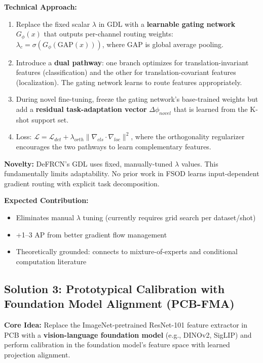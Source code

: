 \documentclass[11pt,a4paper]{article}
\begin{document}
\textbf{Technical Approach:}
\begin{enumerate}[nosep]
    \item Replace the fixed scalar $\lambda$ in GDL with a \textbf{learnable gating network} $G_\phi(x)$ that outputs per-channel routing weights: $\lambda_c = \sigma(G_\phi(\text{GAP}(x)))$, where GAP is global average pooling.
    \item Introduce a \textbf{dual pathway}: one branch optimizes for translation-invariant features (classification) and the other for translation-covariant features (localization). The gating network learns to route features appropriately.
    \item During novel fine-tuning, freeze the gating network's base-trained weights but add a \textbf{residual task-adaptation vector} $\Delta\phi_{novel}$ that is learned from the K-shot support set.
    \item Loss: $\mathcal{L} = \mathcal{L}_{det} + \lambda_{orth}\|\nabla_{cls} \cdot \nabla_{loc}\|^2$, where the orthogonality regularizer encourages the two pathways to learn complementary features.
\end{enumerate}

\textbf{Novelty:} DeFRCN's GDL uses fixed, manually-tuned $\lambda$ values. This fundamentally limits adaptability. No prior work in FSOD learns input-dependent gradient routing with explicit task decomposition.

\textbf{Expected Contribution:}
\begin{itemize}[nosep]
    \item Eliminates manual $\lambda$ tuning (currently requires grid search per dataset/shot)
    \item +1--3 AP from better gradient flow management
    \item Theoretically grounded: connects to mixture-of-experts and conditional computation literature
\end{itemize}

\subsection{Solution 3: Prototypical Calibration with Foundation Model Alignment (PCB-FMA)}

\textbf{Core Idea:} Replace the ImageNet-pretrained ResNet-101 feature extractor in PCB with a \textbf{vision-language foundation model} (e.g., DINOv2, SigLIP) and perform calibration in the foundation model's feature space with learned projection alignment.
\end{document}
